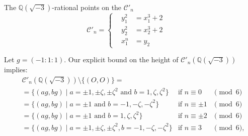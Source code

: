 \documentclass[12pt]{beamer}
\newcommand{\qe}{\mathbb{Q}}
\newcommand{\Ci}{\mathcal{C}}
\begin{document}
  \begin{frame}{ The  $\qe(\sqrt{-3})$-rational points on the  $\Ci'_n$ }
\begin{equation*}
\mathcal{C}'_n=\begin{cases}
\,\,\,\,\,y_1^2&=x_1^3+2\,\,\,\,\,\,\,\,\\
\,\,\,\,\,y_2^2&=x_2^3+2\,\,\,\,\,\,\,\,\\
\,\,\,\,\,x_1^n&=y_2
\end{cases}
\end{equation*}

 \begin{alertblock}{Let $g=(-1:1:1)$. Our explicit bound on the height of $\Ci'_n(\qe(\sqrt{-3}))$  implies:}   
     \begin{align*}
	&\Ci'_n(\qe(\sqrt{-3}))\setminus\{(O,O)\} = & & \\
	&=\{(a g, b g)\mid a=\pm 1, \pm \zeta, \pm \zeta^2\text{ and }b=1,\zeta,\zeta^2\}	&\text{if }n\equiv 0&\pmod 6\\
	&=\{(a g, b g)\mid a=\pm 1\text{ and }b=-1,-\zeta,-\zeta^2\}	&\text{if }n\equiv \pm 1&\pmod 6\\
	&=\{(a g, b g)\mid a=\pm 1\text{ and }b=1,\zeta,\zeta^2\}	&\text{if }n\equiv \pm 2&\pmod 6\\
	&=\{(a g, b g)\mid a=\pm 1, \pm \zeta, \pm \zeta^2, b=-1,-\zeta,-\zeta^2\}	&\text{if }n\equiv 3&\pmod 6,
     \end{align*}
 \end{alertblock}
 \end{frame}
\end{document}
